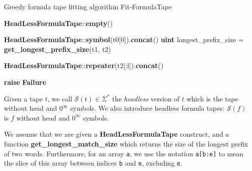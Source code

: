 \begin{algorithm}
    \caption{Greedy formula tape fitting algorithm {\sc Fit-FormulaTape}}\label{alg:greedy-formula-tape-fitting}
    \begin{algorithmic}[1]


        \State \Return \textbf{HeadLessFormulaTape}::\textbf{empty}()

        \EndIf
        \State
        \State \Return \textbf{HeadLessFormulaTape}::\textbf{symbol}(t0[0]).\textbf{concat}()
        \EndIf
        \State
        \State
        \textbf{uint} longest\_prefix\_size = \textbf{get\_longest\_prefix\_size}(t1, t2)
        \State

        \State \Return \textbf{HeadLessFormulaTape}::\textbf{repeater}(t2[:l]).\textbf{concat}()
        \EndIf

        \EndFor
        \State
        \State \textbf{raise} \textbf{Failure}
        \EndProcedure
    \end{algorithmic}
\end{algorithm}


Given a tape $t$, we call $\mathcal{S}(t) \in \Sigma^*$ the \textit{headless} version of $t$ which is the tape without head and $0^\infty$ symbols. We also introduce headless formula tapes: $\mathcal{S}(f)$ is $f$ without head and $0^\infty$ symbols.


\begin{remark}
    We assume that we are given a \textbf{HeadLessFormulaTape} construct, and a function \textbf{get\_longest\_match\_size} which returns the size of the longest prefix of two words. Furthermore, for an array \texttt{a}, we use the notation \texttt{a[b:e]} to mean the slice of this array between indices \texttt{b} and \texttt{e}, excluding \texttt{e}.
\end{remark}


